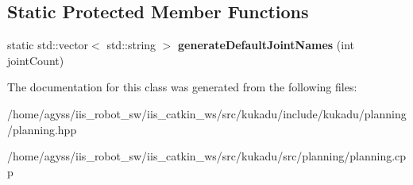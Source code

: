 \subsection*{Static Protected Member Functions}
\begin{DoxyCompactItemize}
\item 
static std\+::vector$<$ std\+::string $>$ {\bfseries generate\+Default\+Joint\+Names} (int joint\+Count)\hypertarget{classkukadu_1_1Kinematics_acb407e22a5efe10767727b94448b32bc}{}\label{classkukadu_1_1Kinematics_acb407e22a5efe10767727b94448b32bc}

\end{DoxyCompactItemize}


The documentation for this class was generated from the following files\+:\begin{DoxyCompactItemize}
\item 
/home/agyss/iis\+\_\+robot\+\_\+sw/iis\+\_\+catkin\+\_\+ws/src/kukadu/include/kukadu/planning/planning.\+hpp\item 
/home/agyss/iis\+\_\+robot\+\_\+sw/iis\+\_\+catkin\+\_\+ws/src/kukadu/src/planning/planning.\+cpp\end{DoxyCompactItemize}
